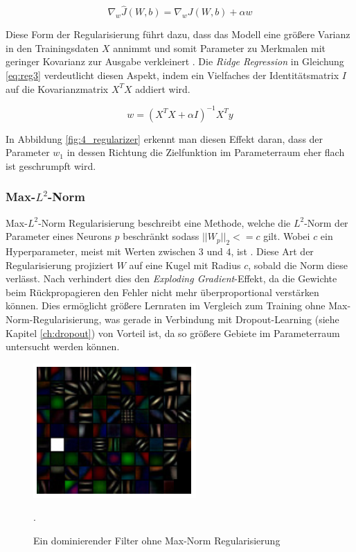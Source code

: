 \begin{equation}
\label{eq:reg2}
\nabla_w \hat{J}(W,b) = \nabla_w J(W,b) + \alpha w
\end{equation}

Diese Form der Regularisierung führt dazu, dass das Modell eine größere Varianz in den Trainingsdaten $X$ annimmt und somit Parameter zu Merkmalen mit geringer Kovarianz zur Ausgabe verkleinert \cite[vgl.][Kap. 7.2, S. 200 f.]{Bengio2015}. Die \textit{Ridge Regression} in Gleichung \ref{eq:reg3} verdeutlicht diesen Aspekt, indem ein Vielfaches der Identitätsmatrix $I$ auf die Kovarianzmatrix $X^TX$ addiert wird.

\begin{equation}
\label{eq:reg3}
w = (X^TX + \alpha I)^{-1} X^Ty
\end{equation}


In Abbildung \ref{fig:4_regularizer} erkennt man diesen Effekt daran, dass der Parameter $w_1$ in dessen Richtung die Zielfunktion im Parameterraum eher flach ist geschrumpft wird.

\subsubsection{Max-$L^2$-Norm}

Max-$L^2$-Norm Regularisierung beschreibt eine Methode, welche die $L^2$-Norm der Parameter eines Neurons $p$ beschränkt sodass $||W_p||_2 <= c$ gilt. Wobei $c$ ein Hyperparameter, meist mit Werten zwischen $3$ und $4$, ist \cite[vgl.][]{Srivastava2014}. Diese Art der Regularisierung projiziert $W$ auf eine Kugel mit Radius $c$, sobald die Norm diese verlässt. 
Nach \cite{Srivastava2014} verhindert dies den \textit{Exploding Gradient}-Effekt, da die Gewichte beim Rückpropagieren den Fehler nicht mehr überproportional verstärken können. Dies ermöglicht größere Lernraten im Vergleich zum Training ohne Max-Norm-Re\-gu\-la\-ri\-sie\-rung, was gerade in Verbindung mit Dropout-Learning (siehe Kapitel \ref{ch:dropout}) von Vorteil ist, da so größere Gebiete im Parameterraum untersucht werden können.

\begin{figure}[H]
\centering
\includegraphics[width=0.4\linewidth]{images/4_max_norm}
\caption[]{Ein dominierender Filter ohne Max-Norm Regularisierung  \cite[siehe][]{Zeiler2014}}.
\label{fig:4_max_norm}
\end{figure}

